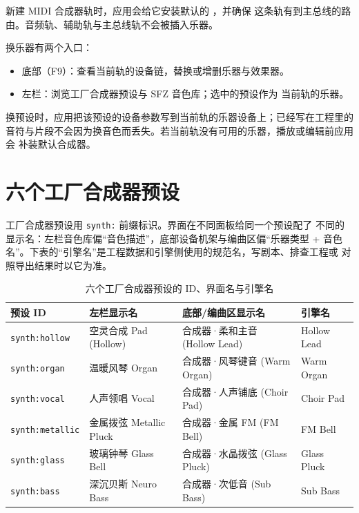新建 MIDI 合成器轨时，应用会给它安装默认的 ，并确保
这条轨有到主总线的路由。音频轨、辅助轨与主总线轨不会被插入乐器。

换乐器有两个入口：

\begin{itemize}
  \item 底部（F9）：查看当前轨的设备链，替换或增删乐器与效果器。
  \item 左栏：浏览工厂合成器预设与 SFZ 音色库；选中的预设作为
        当前轨的乐器。
\end{itemize}

换预设时，应用把该预设的设备参数写到当前轨的乐器设备上；已经写在工程里的
音符与片段不会因为换音色而丢失。若当前轨没有可用的乐器，播放或编辑前应用会
补装默认合成器。


\section{六个工厂合成器预设}

工厂合成器预设用 \texttt{synth:} 前缀标识。界面在不同面板给同一个预设配了
不同的显示名：左栏音色库偏“音色描述”，底部设备机架与编曲区偏“乐器类型 +
音色名”。下表的“引擎名”是工程数据和引擎侧使用的规范名，写剧本、排查工程或
对照导出结果时以它为准。

\begin{table}[htbp]
\centering
\small
\begin{tabular}{@{}llll@{}}
\hline
预设 ID & 左栏显示名 & 底部/编曲区显示名 & 引擎名 \\
\hline
\texttt{synth:hollow} & 空灵合成 Pad (Hollow) & 合成器·柔和主音 (Hollow Lead) & Hollow Lead \\
\texttt{synth:organ} & 温暖风琴 Organ & 合成器·风琴键音 (Warm Organ) & Warm Organ \\
\texttt{synth:vocal} & 人声领唱 Vocal & 合成器·人声铺底 (Choir Pad) & Choir Pad \\
\texttt{synth:metallic} & 金属拨弦 Metallic Pluck & 合成器·金属 FM (FM Bell) & FM Bell \\
\texttt{synth:glass} & 玻璃钟琴 Glass Bell & 合成器·水晶拨弦 (Glass Pluck) & Glass Pluck \\
\texttt{synth:bass} & 深沉贝斯 Neuro Bass & 合成器·次低音 (Sub Bass) & Sub Bass \\
\hline
\end{tabular}
\caption{六个工厂合成器预设的 ID、界面名与引擎名}
\label{tab:factory-synth-presets}
\end{table}

